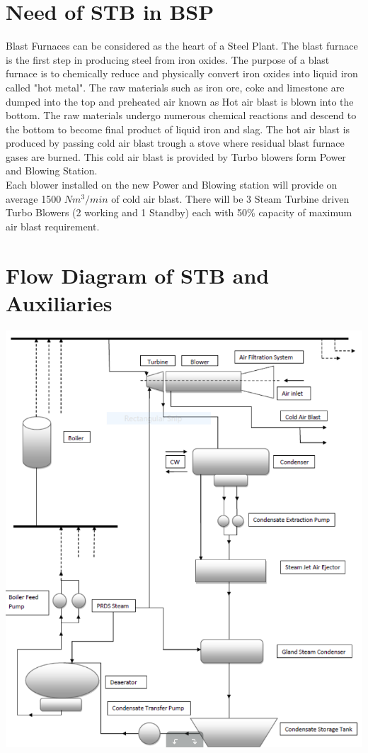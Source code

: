 \documentclass[english,11pt]{report}
\begin{document}
\section{Need of STB in BSP}
Blast Furnaces can be considered as the heart of a Steel Plant. The blast furnace is the first step in producing steel from iron oxides. The purpose of a blast furnace is to chemically reduce and physically convert iron oxides into liquid iron called "hot metal". The raw materials such as iron ore, coke and limestone are dumped into the top and preheated air known as Hot air blast is blown into the bottom. The raw materials undergo numerous chemical reactions and descend to the bottom to become final product of liquid iron and slag. The hot air blast is produced by passing cold air blast trough a stove where residual blast furnace gases are burned. This cold air blast is provided by Turbo blowers form Power and Blowing Station. \\
Each blower installed on the new Power and Blowing station will provide on average 1500 $Nm^{3}/min$ of cold air blast. There will be 3 Steam Turbine driven Turbo Blowers (2 working and 1 Standby) each with 50\% capacity of maximum air blast requirement.\\

\section{Flow Diagram of STB and Auxiliaries}
\includegraphics[width =6in]{stbflow.png}
\end{document}
